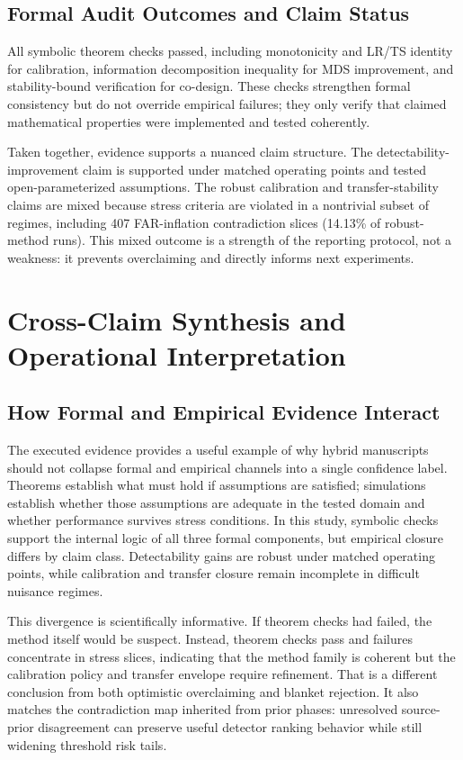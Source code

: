 \subsection{Formal Audit Outcomes and Claim Status}
All symbolic theorem checks passed, including monotonicity and LR/TS identity for calibration, information decomposition inequality for MDS improvement, and stability-bound verification for co-design. These checks strengthen formal consistency but do not override empirical failures; they only verify that claimed mathematical properties were implemented and tested coherently.

Taken together, evidence supports a nuanced claim structure. The detectability-improvement claim is supported under matched operating points and tested open-parameterized assumptions. The robust calibration and transfer-stability claims are mixed because stress criteria are violated in a nontrivial subset of regimes, including 407 FAR-inflation contradiction slices (14.13\% of robust-method runs). This mixed outcome is a strength of the reporting protocol, not a weakness: it prevents overclaiming and directly informs next experiments.

\section{Cross-Claim Synthesis and Operational Interpretation}\label{sec:synthesis}
\subsection{How Formal and Empirical Evidence Interact}
The executed evidence provides a useful example of why hybrid manuscripts should not collapse formal and empirical channels into a single confidence label. Theorems establish what must hold if assumptions are satisfied; simulations establish whether those assumptions are adequate in the tested domain and whether performance survives stress conditions. In this study, symbolic checks support the internal logic of all three formal components, but empirical closure differs by claim class. Detectability gains are robust under matched operating points, while calibration and transfer closure remain incomplete in difficult nuisance regimes.

This divergence is scientifically informative. If theorem checks had failed, the method itself would be suspect. Instead, theorem checks pass and failures concentrate in stress slices, indicating that the method family is coherent but the calibration policy and transfer envelope require refinement. That is a different conclusion from both optimistic overclaiming and blanket rejection. It also matches the contradiction map inherited from prior phases: unresolved source-prior disagreement can preserve useful detector ranking behavior while still widening threshold risk tails.

